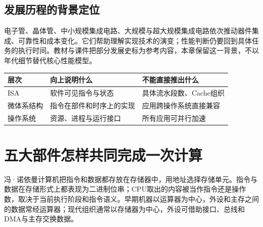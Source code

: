\subsection{发展历程的背景定位}\label{CO01-history}

电子管、晶体管、中小规模集成电路、大规模与超大规模集成电路依次推动器件集成、可靠性和成本变化。它们帮助理解实现技术的演变；性能判断仍要回到具体任务的执行时间。教材与课件把部分发展史标为参考内容，本章保留这一背景，不以年代细节替代核心性能模型。

\begin{wideblock}

\par\medskip\noindent\begin{minipage}{\linewidth}\fontsize{9.3}{12}\selectfont\begin{tabularx}{\linewidth}{@{}YYY@{}}
\toprule\noalign{}
层次 & 向上说明什么 & 不能直接推出什么 \\
\midrule\noalign{}


ISA & 软件可见指令与状态 & 具体流水段数、Cache组织 \\
微体系结构 & 指令在部件和时序上的实现 & 应用跨操作系统直接兼容 \\
操作系统 & 资源、进程与运行接口 & 所有应用可并行加速 \\
\bottomrule\end{tabularx}
\end{minipage}\par\medskip

\end{wideblock}

\section{五大部件怎样共同完成一次计算}\label{CO01-components}

冯·诺依曼计算机把指令和数据都存放在存储器中，用地址选择存储单元。指令与数据在存储形式上都表现为二进制位串；CPU取出的内容被当作指令还是操作数，取决于当前执行阶段和指令语义。早期机器以运算器为中心，外设和主存之间的数据常经运算器；现代组织通常以存储器为中心，外设可借助接口、总线和DMA与主存交换数据。


